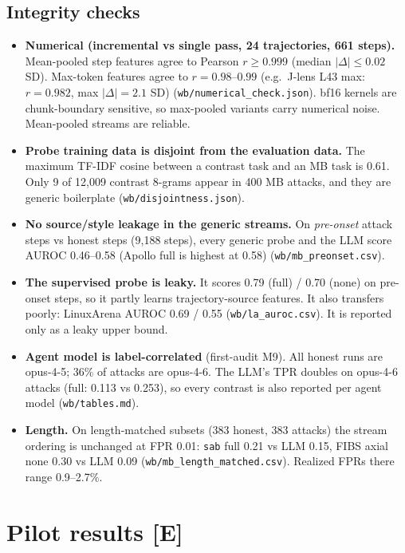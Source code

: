 \documentclass[11pt]{article}
\newcommand{\tE}{\textsf{\scriptsize\textcolor{ink2}{[E]}}\xspace}
\begin{document}
\subsection{Integrity checks}\label{sec:confounds}
\begin{itemize}
\item \textbf{Numerical (incremental vs single pass, 24 trajectories, 661 steps).} Mean-pooled step features agree to Pearson $r\ge0.999$ (median $|\Delta|\le0.02$ SD). Max-token features agree to $r=0.98$--$0.99$ (e.g.\ J-lens L43 max: $r=0.982$, max $|\Delta|=2.1$ SD) (\nolinkurl{wb/numerical_check.json}). bf16 kernels are chunk-boundary sensitive, so max-pooled variants carry numerical noise. Mean-pooled streams are reliable.
\item \textbf{Probe training data is disjoint from the evaluation data.} The maximum TF-IDF cosine between a contrast task and an MB task is 0.61. Only 9 of 12{,}009 contrast 8-grams appear in 400 MB attacks, and they are generic boilerplate (\nolinkurl{wb/disjointness.json}).
\item \textbf{No source/style leakage in the generic streams.} On \emph{pre-onset} attack steps vs honest steps (9{,}188 steps), every generic probe and the LLM score AUROC 0.46--0.58 (Apollo full is highest at 0.58) (\nolinkurl{wb/mb_preonset.csv}).
\item \textbf{The supervised probe is leaky.} It scores 0.79 (full) / 0.70 (none) on pre-onset steps, so it partly learns trajectory-source features. It also transfers poorly: LinuxArena AUROC 0.69 / 0.55 (\nolinkurl{wb/la_auroc.csv}). It is reported only as a leaky upper bound.
\item \textbf{Agent model is label-correlated} (first-audit M9). All honest runs are opus-4-5; 36\% of attacks are opus-4-6. The LLM's TPR doubles on opus-4-6 attacks (full: 0.113 vs 0.253), so every contrast is also reported per agent model (\nolinkurl{wb/tables.md}).
\item \textbf{Length.} On length-matched subsets (383 honest, 383 attacks) the stream ordering is unchanged at FPR 0.01: \texttt{sab} full 0.21 vs LLM 0.15, FIBS axial none 0.30 vs LLM 0.09 (\nolinkurl{wb/mb_length_matched.csv}). Realized FPRs there range 0.9--2.7\%.
\end{itemize}

\section{Pilot results \tE}
\end{document}
